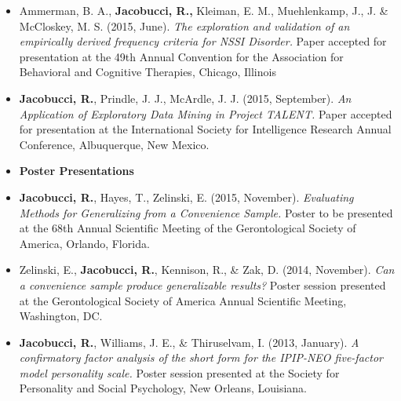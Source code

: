 \documentclass[letterpaper,10pt]{article}
\begin{document}
\begin{itemize}
\item[]Ammerman, B. A., \textbf{Jacobucci, R.,} Kleiman, E. M., Muehlenkamp, J., J. \& McCloskey, M. S. (2015, June). \emph{The exploration and validation of an empirically derived frequency criteria for NSSI Disorder.} Paper accepted for presentation at the 49th Annual Convention for the Association for Behavioral and Cognitive Therapies, Chicago, Illinois
%
\item[] \textbf{Jacobucci, R.}, Prindle, J. J., McArdle, J. J. (2015, September). \emph{An Application of Exploratory Data Mining in Project TALENT.} Paper accepted for presentation at the International Society for Intelligence Research Annual Conference, Albuquerque, New Mexico.
%
%
%
%
%
%
\item[]{\textbf{\large{Poster Presentations}}}
%
\item[] \textbf{Jacobucci, R.}, Hayes, T., Zelinski, E. (2015, November). \emph{Evaluating Methods for Generalizing from a Convenience Sample.} Poster to be presented at the 68th Annual Scientific Meeting of the Gerontological Society of America, Orlando, Florida.
%
\item[]Zelinski, E., \textbf{Jacobucci, R.}, Kennison, R., \& Zak, D. (2014, November). \emph{Can a convenience sample produce generalizable results?} Poster session presented at the Gerontological Society of America Annual Scientific Meeting, Washington, DC.
%
\item[]\textbf{Jacobucci, R.}, Williams, J. E., \& Thiruselvam, I. (2013, January). \emph{A confirmatory factor analysis of the short form for the IPIP-NEO five-factor model personality scale.} Poster session presented at the Society for Personality and Social Psychology, New Orleans, Louisiana.

\end{itemize}
\end{document}
